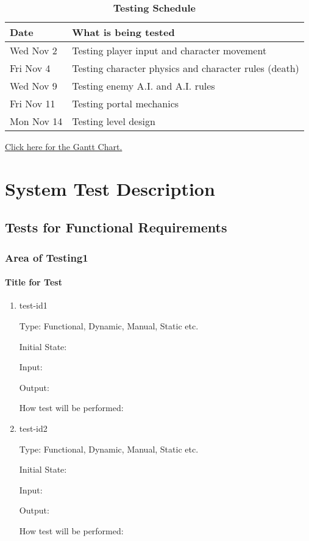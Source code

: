 \documentclass[12pt, titlepage]{article}
\begin{document}
\begin{table}[hbp]
\caption{\textbf{Testing Schedule}} \label{Table}

\begin{tabularx}{\textwidth}{p{3cm}X}
\toprule
\textbf{Date} & \textbf{What is being tested} \\
\midrule
	Wed Nov 2 &	Testing player input and character movement \\
	Fri Nov 4 & Testing character physics and character rules (death)\\
	Wed Nov 9 & Testing enemy A.I. and A.I. rules\\
	Fri Nov 11 & Testing portal mechanics\\
	Mon Nov 14 & Testing level design\\
\bottomrule
\end{tabularx}
\end{table}

\href{run:../../ProjectSchedule/ProjectSchedule.gan}{Click here for the Gantt Chart.}

\section{System Test Description}
	
\subsection{Tests for Functional Requirements}

\subsubsection{Area of Testing1}
		
\paragraph{Title for Test}

\begin{enumerate}

\item{test-id1\\}

Type: Functional, Dynamic, Manual, Static etc.
					
Initial State: 
					
Input: 
					
Output: 
					
How test will be performed: 
					
\item{test-id2\\}

Type: Functional, Dynamic, Manual, Static etc.
					
Initial State: 
					
Input: 
					
Output: 
					
How test will be performed: 

\end{enumerate}
\end{document}

